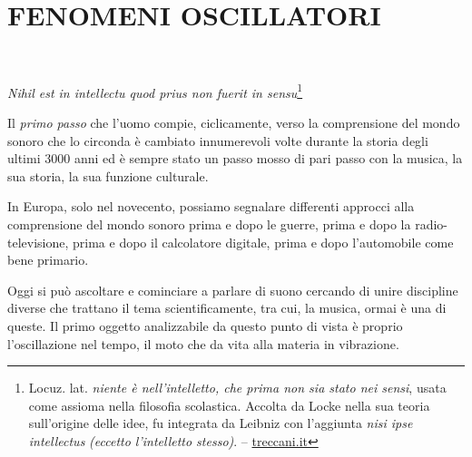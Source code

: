 
\chapter{FENOMENI OSCILLATORI}
\startcontents[chapters]

~\vfill

\begin{flushright}
		\textit{Nihil est in intellectu quod prius non fuerit in sensu}\footnote{
		Locuz. lat. \emph{niente è nell’intelletto, che prima non sia stato nei sensi},
		usata come assioma nella filosofia scolastica. Accolta da Locke nella
		sua teoria sull’origine delle idee, fu integrata da Leibniz con
		l’aggiunta \emph{nisi ipse intellectus} \emph{(eccetto l’intelletto stesso)}. --
		\url{treccani.it}}
	\end{flushright}

\bigskip

Il \emph{primo passo} che l'uomo compie, ciclicamente, verso la comprensione del
mondo sonoro che lo circonda è cambiato innumerevoli volte durante la storia degli
ultimi 3000 anni ed è sempre stato un passo mosso di pari passo con la musica,
la sua storia, la sua funzione culturale.

In Europa, solo nel novecento, possiamo segnalare differenti approcci alla
comprensione del mondo sonoro prima e dopo le guerre, prima e dopo la radio-televisione,
prima e dopo il calcolatore digitale, prima e dopo l'automobile come bene primario.


Oggi si può ascoltare e cominciare a parlare di suono cercando di unire discipline diverse
che trattano il tema scientificamente, tra cui, la musica, ormai è una di queste.
Il primo oggetto analizzabile da questo punto di vista è proprio l'oscillazione nel tempo,
il moto che da vita alla materia in vibrazione.

\clearpage



